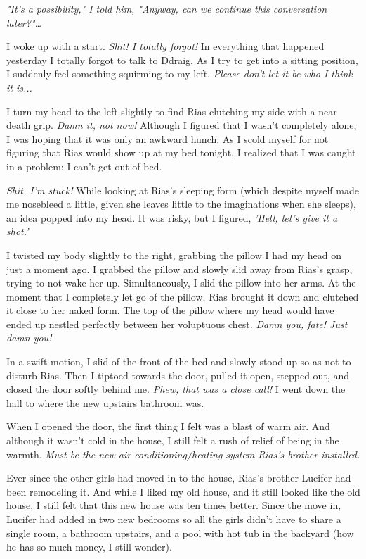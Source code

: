 \documentclass{article}
\begin{document}
\emph{"It's a possibility," I told him, "Anyway, can we continue this conversation later?"…}

I woke up with a start. \emph{Shit! I totally forgot!} In everything that happened yesterday I totally forgot to talk to Ddraig. As I try to get into a sitting position, I suddenly feel something squirming to my left. \emph{Please don't let it be who I think it is...}

I turn my head to the left slightly to find Rias clutching my side with a near death grip. \emph{Damn it, not now!} Although I figured that I wasn't completely alone, I was hoping that it was only an awkward hunch. As I scold myself for not figuring that Rias would show up at my bed tonight, I realized that I was caught in a problem: I can't get out of bed.

\emph{Shit, I'm stuck!} While looking at Rias's sleeping form (which despite myself made me nosebleed a little, given she leaves little to the imaginations when she sleeps), an idea popped into my head. It was risky, but I figured, \emph{'Hell, let's give it a shot.'}

I twisted my body slightly to the right, grabbing the pillow I had my head on just a moment ago. I grabbed the pillow and slowly slid away from Rias's grasp, trying to not wake her up. Simultaneously, I slid the pillow into her arms. At the moment that I completely let go of the pillow, Rias brought it down and clutched it close to her naked form. The top of the pillow where my head would have ended up nestled perfectly between her voluptuous chest. \emph{Damn you, fate! Just damn you!}

In a swift motion, I slid of the front of the bed and slowly stood up so as not to disturb Rias. Then I tiptoed towards the door, pulled it open, stepped out, and closed the door softly behind me. \emph{Phew, that was a close call!} I went down the hall to where the new upstairs bathroom was.

When I opened the door, the first thing I felt was a blast of warm air. And although it wasn't cold in the house, I still felt a rush of relief of being in the warmth. \emph{Must be the new air conditioning/heating system Rias's brother installed.} 

Ever since the other girls had moved in to the house, Rias's brother Lucifer had been remodeling it. And while I liked my old house, and it still looked like the old house, I still felt that this new house was ten times better. Since the move in, Lucifer had added in two new bedrooms so all the girls didn't have to share a single room, a bathroom upstairs, and a pool with hot tub in the backyard (how he has so much money, I still wonder).
\end{document}

